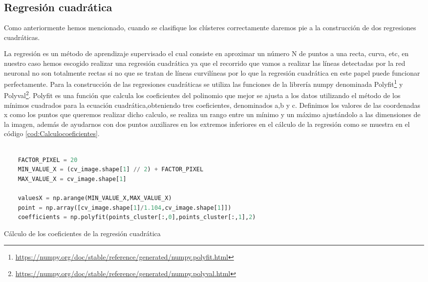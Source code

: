 \subsection{Regresión cuadrática}
\label{sec:Regresión cuadrática}
Como anteriormente hemos mencionado, cuando se clasifique los clústeres correctamente daremos pie a la construcción de dos regresiones cuadráticas. \newline 

La regresión es un método de aprendizaje supervisado el cual consiste en aproximar un número N de puntos a una recta, curva, etc, en nuestro caso hemos escogido realizar una regresión cuadrática ya que el recorrido
que vamos a realizar las líneas detectadas por la red neuronal no son totalmente rectas si no que se tratan de líneas curvilíneas por lo que la regresión cuadrática en este papel puede 
funcionar perfectamente. 
Para la construcción de las regresiones cuadráticas se utiliza las funciones de la librería numpy denominada Polyfit\footnote{\url{https://numpy.org/doc/stable/reference/generated/numpy.polyfit.html}}
y Polyval\footnote{\url{ https://numpy.org/doc/stable/reference/generated/numpy.polyval.html}}. 
Polyfit es una función que calcula los coeficientes del polinomio que mejor se ajusta a los datos utilizando el método de los mínimos 
cuadrados para la ecuación cuadrática,obteniendo tres coeficientes, denominados a,b y c. Definimos los valores de las coordenadas x como los puntos que queremos
realizar dicho calculo, se realiza un rango entre un mínimo y un máximo ajustándolo a las dimensiones de la imagen, además de 
ayudarnos con dos puntos auxiliares en los extremos inferiores en el cálculo de la regresión como se muestra en el código \ref{cod:Calculocoeficientes}.
 \newline

\begin{code}[H]
  \begin{lstlisting}[language=Python]
  
    FACTOR_PIXEL = 20
    MIN_VALUE_X = (cv_image.shape[1] // 2) + FACTOR_PIXEL
    MAX_VALUE_X = cv_image.shape[1]
  
    valuesX = np.arange(MIN_VALUE_X,MAX_VALUE_X) 
    point = np.array([cv_image.shape[1]/1.104,cv_image.shape[1]])
    coefficients = np.polyfit(points_cluster[:,0],points_cluster[:,1],2)
  \end{lstlisting}
  \caption[Calculo de los coeficientes]{Cálculo de los coeficientes de la regresión cuadrática}
  \label{cod:Calculocoeficientes}
  \end{code}  

